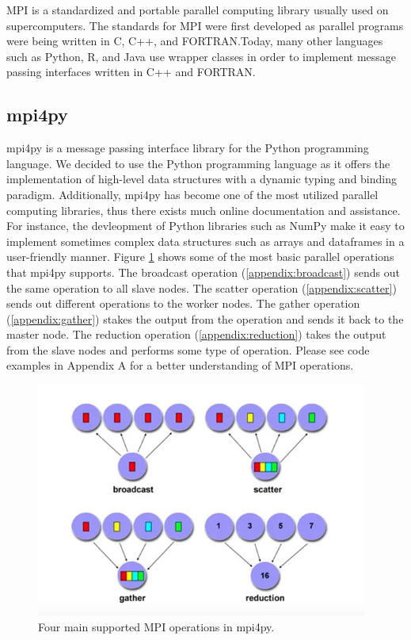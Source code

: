 	MPI is a standardized and portable parallel computing library usually used on supercomputers. The standards for MPI were first developed as parallel programs were being written in C, C++, and FORTRAN.Today, many other languages such as Python, R, and Java use wrapper classes in order to implement message passing interfaces written in C++ and FORTRAN.

\subsection{mpi4py}
	mpi4py is a message passing interface library for the Python programming language. We decided to use the Python programming language as it offers the implementation of high-level data structures with a dynamic typing and binding paradigm. Additionally, mpi4py has become one of the most utilized parallel computing libraries, thus there exists much online documentation and assistance. For instance, the devleopment of Python libraries such as NumPy make it easy to implement sometimes complex data structures such as arrays and dataframes in a user-friendly manner. Figure \ref{fig:MPI Operations} shows some of the most basic parallel operations that mpi4py supports. The broadcast operation (\ref{appendix:broadcast}) sends out the same operation to all slave nodes. The scatter operation (\ref{appendix:scatter}) sends out different operations to the worker nodes. The gather operation (\ref{appendix:gather}) stakes the output from the operation and sends it back to the master node. The reduction operation (\ref{appendix:reduction}) takes the output from the slave nodes and performs some type of operation. Please see code examples in Appendix A for a better understanding of MPI operations.
	
	
\begin{figure}
\centering
\includegraphics{Figures/mpi-diagram}
\decoRule
\caption[MPI Operations]{Four main supported MPI operations in mpi4py.}
\label{fig:MPI Operations}
\end{figure}


